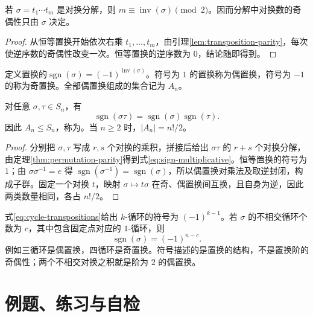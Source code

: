 \documentclass[UTF8,12pt,a4paper,fontset=fandol]{ctexbook}
\begin{document}
\begin{theorem}[置换奇偶性的良定义性]\label{thm:permutation-parity}
若 $\sigma=t_1\cdots t_m$ 是对换分解，则 $m\equiv\operatorname{inv}(\sigma)\pmod2$。因而分解中对换数的奇偶性只由 $\sigma$ 决定。
\end{theorem}
\begin{proof}
从恒等置换开始依次右乘 $t_1,\ldots,t_m$，由引理\ref{lem:transposition-parity}，每次使逆序数的奇偶性改变一次。恒等置换的逆序数为 $0$，结论随即得到。
\end{proof}

\begin{definition}[符号与交错群]
定义置换的$\operatorname{sgn}(\sigma)=(-1)^{\operatorname{inv}(\sigma)}$。符号为 $1$ 的置换称为偶置换，符号为 $-1$ 的称为奇置换。全部偶置换组成的集合记为 $A_n$。
\end{definition}

\begin{proposition}[符号的乘法性]\label{prop:sign-multiplicative}
对任意 $\sigma,\tau\in S_n$，有
\begin{equation}\label{eq:sign-multiplicative}
  \operatorname{sgn}(\sigma\tau)
  =\operatorname{sgn}(\sigma)\operatorname{sgn}(\tau).
\end{equation}
因此 $A_n\leq S_n$，称为。当 $n\geq2$ 时，$|A_n|=n!/2$。
\end{proposition}
\begin{proof}
分别把 $\sigma,\tau$ 写成 $r,s$ 个对换的乘积，拼接后给出 $\sigma\tau$ 的 $r+s$ 个对换分解，由定理\ref{thm:permutation-parity}得到式\eqref{eq:sign-multiplicative}。恒等置换的符号为 $1$；由 $\sigma\sigma^{-1}=e$ 得 $\operatorname{sgn}(\sigma^{-1})=\operatorname{sgn}(\sigma)$，所以偶置换对乘法及取逆封闭，构成子群。固定一个对换 $t$，映射 $\sigma\mapsto t\sigma$ 在奇、偶置换间互换，且自身为逆，因此两类数量相同，各占 $n!/2$。
\end{proof}

式\eqref{eq:cycle-transpositions}给出 $k$-循环的符号为 $(-1)^{k-1}$。若 $\sigma$ 的不相交循环个数为 $c$，其中包含固定点对应的 $1$-循环，则
\begin{equation}\label{eq:sign-cycle-count}
  \operatorname{sgn}(\sigma)=(-1)^{n-c}.
\end{equation}
例如三循环是偶置换，四循环是奇置换。符号描述的是置换的结构，不是置换阶的奇偶性；两个不相交对换之积就是阶为 $2$ 的偶置换。

\section{例题、练习与自检}
\end{document}
